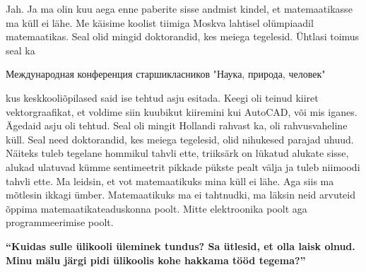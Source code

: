 Jah. Ja ma olin kuu aega enne paberite sisse andmist kindel, et matemaatikasse
ma küll ei lähe. Me käisime koolist tiimiga Moskva lahtisel
olümpiaadil matemaatikas. Seal olid mingid doktorandid, kes meiega tegelesid.
Ühtlasi toimus seal ka \begin{russian}Международная конференция старшикласников
"Наука, природа, человек"\end{russian} kus
keskkooliõpilased said ise tehtud asju esitada. Keegi oli teinud kiiret
vektorgraafikat, et voldime siin kuubikut kiiremini kui AutoCAD, või mis
iganes. Ägedaid asju oli tehtud. Seal oli mingit Hollandi rahvast ka, oli
rahvusvaheline küll. Seal need doktorandid, kes meiega tegelesid, olid
nihukesed parajad uhuud. Näiteks tuleb tegelane hommikul tahvli ette, triiksärk
on lükatud alukate sisse, alukad ulatuvad kümme sentimeetrit pikkade pükste
pealt välja ja tuleb niimoodi tahvli ette. Ma leidsin, et vot matemaatikuks
mina küll ei lähe. Aga siis ma mõtlesin ikkagi ümber. Matemaatikuks ma ei
tahtnudki, ma läksin neid arvuteid õppima matemaatikateaduskonna poolt. Mitte elektroonika poolt aga
programmeerimise poolt.

\textbf{\enquote{Kuidas sulle ülikooli üleminek tundus? Sa ütlesid, et olla
laisk olnud. Minu mälu järgi pidi ülikoolis kohe hakkama tööd tegema?}}

